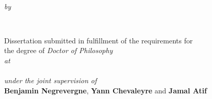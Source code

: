 \begin{titlepage}
  \vspace*{1cm}
  \makeatletter
  \begin{center}
    \begin{mdframed}[linecolor=mydarkblue,linewidth=2pti,leftline=false,rightline=false]
        \centering
	\huge
	\textbf{\color{mydarkblue} \@title }
      \end{mdframed}
    ~\\[0.3cm]
    \begin{Large}
      \emph{by} ~\\[0.3cm]
      \textbf{\@author}
    \end{Large}
    ~\\[3cm]
    \begin{Large}
      Dissertation submitted in fulfillment of the requirements for ~\\
      the degree of \emph{Doctor of Philosophy} ~\\[1cm]
      \emph{at} ~\\[1cm]
      \textsc{\@institute} ~\\[1cm]
      \emph{under the joint supervision of}~\\[1cm]
      \textbf{Benjamin Negrevergne}, \textbf{Yann Chevaleyre} and \textbf{Jamal Atif}
    \end{Large}
  \end{center}
  \makeatother
\end{titlepage}

\newpage
\null
\thispagestyle{empty}
\newpage
